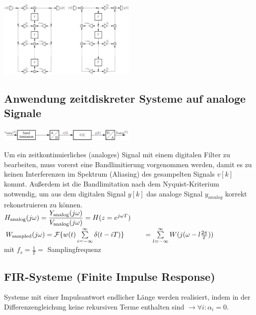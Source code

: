 \documentclass[a4paper,landscape,6pt]{article}
\begin{document}
\begin{multicols}{3}
\begin{minipage}[t]{0.6\textwidth}
	\includegraphics[width=0.5\textwidth]{images_ssp/DigSys_kanonische}\\
\end{minipage}
\subsection*{Anwendung zeitdiskreter Systeme auf analoge Signale}
\begin{minipage}[t]{0.6\textwidth}
	\includegraphics[width=0.5\textwidth]{images_ssp/DigSys_in_anaSys}\\
\end{minipage}
Um ein zeitkontinuierliches (analoges) Signal mit einem digitalen Filter zu bearbeiten, muss vorerst eine Bandlimitierung vorgenommen werden, damit es zu keinen Interferenzen im Spektrum (Aliasing) des gesampelten Signals $v[k]$ kommt. Außerdem ist die Bandlimitation nach dem Nyquist-Kriterium notwendig, um aus dem digitalen Signal $y[k]$ das analoge Signal $y_{analog}$ korrekt rekonstruieren zu können.\\

$H_{\textmd{analog}}(j\omega) = \dfrac{Y_{\textmd{analog}}(j\omega)}{V_{\textmd{analog}}(j\omega)} = H(z=e^{j\omega T})$\\

$W_{\textmd{sampled}}(j\omega) = \mathcal{F}\{w(t)\sum\limits_{i=-\infty}^{\infty}\delta(t-iT)\} \\ \hspace*{1cm} = \sum\limits_{l=-\infty}^{\infty}W(j(\omega - l\frac{2\pi}{T}))$\\

mit $f_s = \frac{1}{T} =$ Samplingfrequenz

\subsection*{FIR-Systeme \footnotesize{(Finite Impulse Response)}}
Systeme mit einer Impulsantwort endlicher Länge werden realisiert, indem in der Differenzengleichung keine rekursiven Terme enthalten sind $\rightarrow \forall i : \alpha_i = 0$.\\


\end{multicols}
\end{document}
